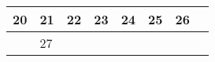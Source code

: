 {\begin{tabularx}{\linewidth}{|l!{\vrule width \myLenLineThicknessThick}*{7}{@{}X@{}|}}
      
      
        \begin{minipage}[t]{6mm}\centering{}20\end{minipage}
      
       & 
    
      
      
        \begin{minipage}[t]{6mm}\centering{}21\end{minipage}
      
       & 
    
      
      
        \begin{minipage}[t]{6mm}\centering{}22\end{minipage}
      
       & 
    
      
      
        \begin{minipage}[t]{6mm}\centering{}23\end{minipage}
      
       & 
    
      
      
        \begin{minipage}[t]{6mm}\centering{}24\end{minipage}
      
       & 
    
      
      
        \begin{minipage}[t]{6mm}\centering{}25\end{minipage}
      
       & 
    
      
      
        \begin{minipage}[t]{6mm}\centering{}26\end{minipage}
      
      
        \\  \hline 
      
    
  
  
  
  \hyperlink{week-2027-39}{} &
    
      
      
        \begin{minipage}[t]{6mm}\centering{}27\end{minipage}
      

\end{tabularx}}
